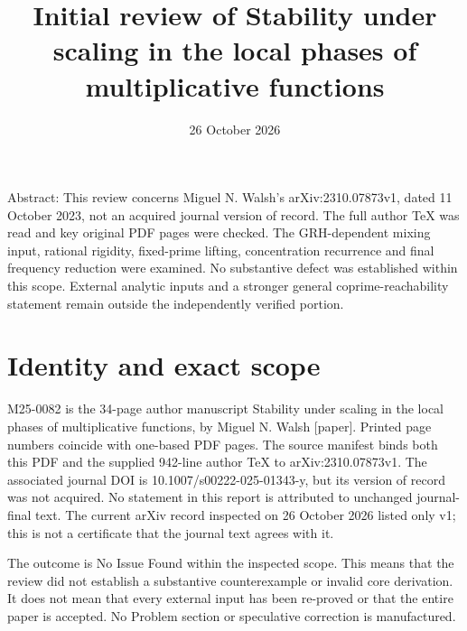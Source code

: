 \documentclass[10pt]{article}
\title{Initial review of
Stability under scaling in the local phases
of multiplicative functions}
\author{}
\date{26 October 2026}
\begin{document}
\maketitle
Abstract: This review concerns Miguel N. Walsh’s arXiv:2310.07873v1, dated 11 October 2023, not an acquired journal version of record. The full author TeX was read and key original PDF pages were checked. The GRH-dependent mixing input, rational rigidity, fixed-prime lifting, concentration recurrence and final frequency reduction were examined. No substantive defect was established within this scope. External analytic inputs and a stronger general coprime-reachability statement remain outside the independently verified portion.\par
\section*{Identity and exact scope}
M25-0082 is the 34-page author manuscript Stability under scaling in the local phases of multiplicative functions, by Miguel N. Walsh [paper]. Printed page numbers coincide with one-based PDF pages. The source manifest binds both this PDF and the supplied 942-line author TeX to arXiv:2310.07873v1. The associated journal DOI is 10.1007/s00222-025-01343-y, but its version of record was not acquired. No statement in this report is attributed to unchanged journal-final text. The current arXiv record inspected on 26 October 2026 listed only v1; this is not a certificate that the journal text agrees with it.\par
The outcome is No Issue Found within the inspected scope. This means that the review did not establish a substantive counterexample or invalid core derivation. It does not mean that every external input has been re-proved or that the entire paper is accepted. No Problem section or speculative correction is manufactured.\par
\end{document}
